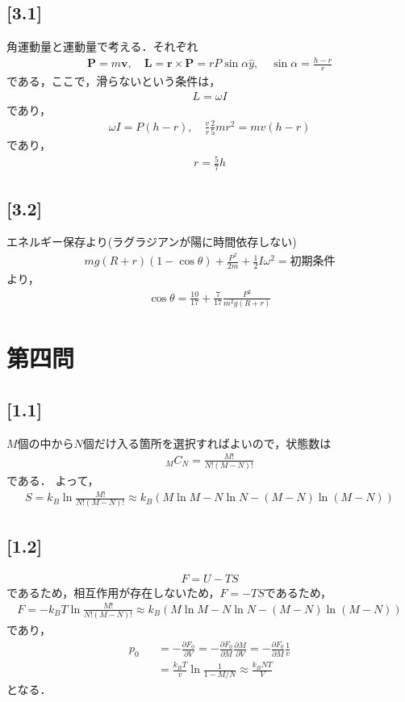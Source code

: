 \documentclass[12pt,dvipdfmx]{jsarticle}
\begin{document}
\subsection*{\large{[3.1]}}
角運動量と運動量で考える．それぞれ
\begin{eqnarray}
  \bm{P} = m\bm{v},\quad \bm{L} = \bm{r}\times \bm{P} = rP\sin\alpha \hat{y},\quad \sin\alpha = \frac{h-r}{r}
\end{eqnarray}
である，ここで，滑らないという条件は，
\begin{eqnarray}
  L = \omega I
\end{eqnarray}
であり，
\begin{eqnarray}
  \omega I = P(h-r),\quad \frac{v}{r}\frac{2}{5}mr^2 = mv (h-r)
\end{eqnarray}
であり，
\begin{eqnarray}
  r = \frac{5}{7}h
\end{eqnarray}
\subsection*{\large{[3.2]}}
エネルギー保存より(ラグラジアンが陽に時間依存しない)
\begin{eqnarray}
  mg(R+r)(1-\cos\theta) + \frac{P^2}{2m} + \frac{1}{2}I\omega^2 = 初期条件
\end{eqnarray}
より，
\begin{eqnarray}
  \cos\theta = \frac{10}{17} + \frac{7}{17}\frac{P^2}{m^2 g (R+r)}
\end{eqnarray}

\newpage
\section*{\Large{第四問}}
\subsection*{\large{[1.1]}}
$M$個の中から$N$個だけ入る箇所を選択すればよいので，状態数は
\begin{eqnarray}
  {}_MC_N = \frac{M!}{N!(M-N)!}
\end{eqnarray}
である．
よって，
\begin{eqnarray}
  S = k_B \ln \frac{M!}{N!(M-N)!}\approx k_B \left( M\ln M - N\ln N -(M-N)\ln(M-N) \right)
\end{eqnarray}
\subsection*{\large{[1.2]}}
\begin{eqnarray}
  F = U-TS
\end{eqnarray}
であるため，相互作用が存在しないため，$F=-TS$であるため，
\begin{eqnarray}
  F = - k_B T\ln \frac{M!}{N!(M-N)!}\approx k_B \left( M\ln M - N\ln N -(M-N)\ln(M-N) \right)
\end{eqnarray}
であり，
\begin{eqnarray}
  p_0 &&= -\frac{\partial F_0}{\partial V} = -\frac{\partial F_0}{\partial M} \frac{\partial M}{\partial V} = -\frac{\partial F_0}{\partial M}\frac{1}{v}\\
  &&= \frac{k_BT}{v}\ln \frac{1}{1-M/N} \approx \frac{k_B N T}{V}
\end{eqnarray}
となる．
\end{document}
